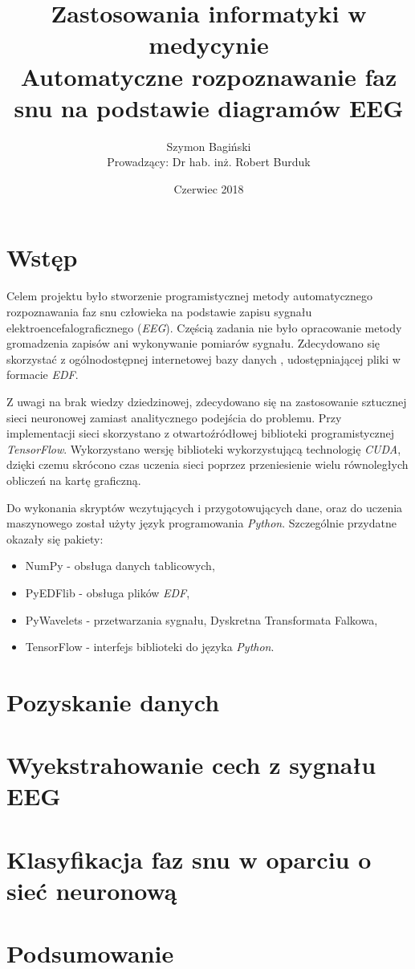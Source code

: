 \documentclass[12pt]{report}
\title{\Huge Zastosowania informatyki w medycynie \\[1cm]\Huge Automatyczne rozpoznawanie faz snu na podstawie diagramów EEG}
\author{Szymon Bagiński \\[1cm]{\small Prowadzący: Dr hab. inż. Robert Burduk}}
\date{Czerwiec 2018}
\begin{document}
    \begin{titlepage}
        \maketitle
    \end{titlepage}

    \tableofcontents

    \chapter*{Wstęp}
        Celem projektu było stworzenie programistycznej metody automatycznego rozpoznawania faz snu człowieka na podstawie zapisu sygnału elektroencefalograficznego (\textit{EEG}). Częścią zadania nie było opracowanie metody gromadzenia zapisów ani wykonywanie pomiarów sygnału. Zdecydowano się skorzystać z ogólnodostępnej internetowej bazy danych \cite{}, udostępniającej pliki w formacie \textit{EDF}. %

        Z uwagi na brak wiedzy dziedzinowej, zdecydowano się na zastosowanie sztucznej sieci neuronowej zamiast analitycznego podejścia do problemu. Przy implementacji sieci skorzystano z otwartoźródłowej biblioteki programistycznej \textit{TensorFlow}. Wykorzystano wersję biblioteki wykorzystującą technologię \textit{CUDA}, dzięki czemu skrócono czas uczenia sieci poprzez przeniesienie wielu równoległych obliczeń na kartę graficzną. %

        Do wykonania skryptów wczytujących i przygotowujących dane, oraz do uczenia maszynowego został użyty język programowania \textit{Python}. Szczególnie przydatne okazały się pakiety:
        \begin{itemize}
            \item NumPy - obsługa danych tablicowych,
            \item PyEDFlib - obsługa plików \textit{EDF},
            \item PyWavelets - przetwarzania sygnału, Dyskretna Transformata Falkowa,
            \item TensorFlow - interfejs biblioteki do języka \textit{Python}.
        \end{itemize}

    \chapter{Pozyskanie danych}

    \chapter{Wyekstrahowanie cech z sygnału EEG}

    \chapter{Klasyfikacja faz snu w oparciu o sieć neuronową}

    \chapter*{Podsumowanie}

    \cite{dirac}    %
    \printbibliography[heading=bibintoc, title={Bibliografia}]
\end{document}

